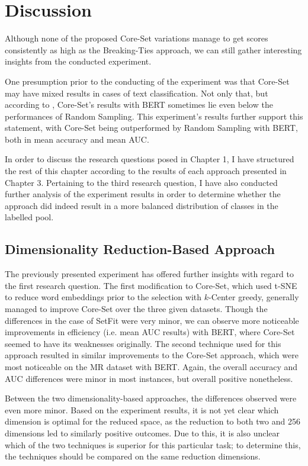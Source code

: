 \documentclass[english,bachelor,ul]{webisthesis} %
\begin{document}
\chapter{Discussion}

Although none of the proposed Core-Set variations manage to get scores consistently as high as the Breaking-Ties approach, we can still gather interesting insights from the conducted experiment. 

One presumption prior to the conducting of the experiment was that Core-Set may have mixed results in cases of text classification. Not only that, but according to \cite{DBLP:conf/kdd/0002MM21}, Core-Set's results with BERT sometimes lie even below the performances of Random Sampling. This experiment's results further support this statement, with Core-Set being outperformed by Random Sampling with BERT, both in mean accuracy and mean AUC.

In order to discuss the research questions posed in Chapter 1, I have structured the rest of this chapter according to the results of each approach presented in Chapter 3. Pertaining to the third research question, I have also conducted further analysis of the experiment results in order to determine whether the approach did indeed result in a more balanced distribution of classes in the labelled pool.

\section{Dimensionality Reduction-Based Approach}

The previously presented experiment has offered further insights with regard to the first research question. The first modification to Core-Set, which used t-SNE to reduce word embeddings prior to the selection with $k$-Center greedy, generally managed to improve Core-Set over the three given datasets. Though the differences in the case of SetFit were very minor, we can observe more noticeable improvements in efficiency (i.e. mean AUC results) with BERT, where Core-Set seemed to have its weaknesses originally. The second technique used for this approach resulted in similar improvements to the Core-Set approach, which were most noticeable on the MR dataset with BERT. Again, the overall accuracy and AUC differences were minor in most instances, but overall positive nonetheless.

Between the two dimensionality-based approaches, the differences observed were even more minor. Based on the experiment results, it is not yet clear which dimension is optimal for the reduced space, as the reduction to both two and 256 dimensions led to similarly positive outcomes. Due to this, it is also unclear which of the two techniques is superior for this particular task; to determine this, the techniques should be compared on the same reduction dimensions.
\end{document}
